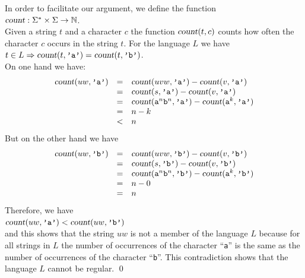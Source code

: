 In order to facilitate our argument, we define the function
\\[0.2cm]
\hspace*{1.3cm}
$\textsl{count}: \Sigma^* \times \Sigma \rightarrow \mathbb{N}$.
\\[0.2cm]
Given a  string $t$ and a character $c$ the function $\textsl{count}(t,c)$ counts how often the
character $c$ occurs in the string $t$.  For the language  $L$ we have
\\[0.2cm]
\hspace*{1.3cm}
$t \in L \Rightarrow \textsl{count}(t,\texttt{'a'}) = \textsl{count}(t, \texttt{'b'})$. 
\\[0.2cm]
On one hand we have:
\[  
\begin{array}{lcl}
\textsl{count}(uw,\texttt{'a'}) & = & \textsl{count}(uvw,\texttt{'a'}) - \textsl{count}(v,\texttt{'a'}) \\
 & = & \textsl{count}(s,\texttt{'a'}) - \textsl{count}(v,\texttt{'a'}) \\
 & = & \textsl{count}(\mathtt{a}^n\mathtt{b}^n,\texttt{'a'}) - \textsl{count}(\mathtt{a}^k,\texttt{'a'}) \\
 & = & n - k  \\
 & < & n   \\
\end{array}
\]
But on the other hand we have
\[  
\begin{array}{lcl}
\textsl{count}(uw,\texttt{'b'}) & = & \textsl{count}(uvw,\texttt{'b'}) - \textsl{count}(v,\texttt{'b'}) \\
                               & = & \textsl{count}(s,\texttt{'b'}) - \textsl{count}(v,\texttt{'b'}) \\
 & = & \textsl{count}(\mathtt{a}^n\mathtt{b}^n,\texttt{'b'}) - \textsl{count}(\mathtt{a}^k,\texttt{'b'}) \\
                               & = & n  - 0\\
                               & = & n  
\end{array}
\]
Therefore, we have
\\[0.2cm]
\hspace*{1.3cm}
$\textsl{count}(uw,\texttt{'a'}) < \textsl{count}(uw,\texttt{'b'})$
\\[0.2cm]
and this shows that the string $uw$ is not a member of the language $L$ because for all strings in $L$ 
the number of occurrences of the character ``\texttt{a}'' is the same as the number of
occurrences of the character ``\texttt{b}''.  This contradiction shows that the language $L$ cannot
be regular.
\qed

